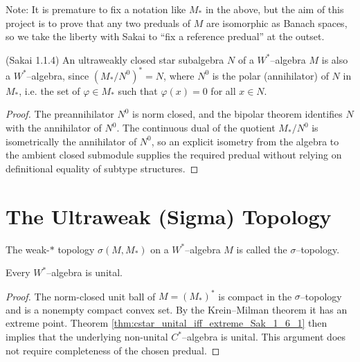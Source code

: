 Note: It is premature to fix a notation like $M_{*}$ in the above, but the aim of this project is to prove that any two
preduals of $M$ are isomorphic as Banach spaces, so we take the liberty with Sakai to ``fix a reference predual'' at the outset.

\begin{lemma}
    \label{lem:sigma_closed_star_subalg_wstar} (Sakai 1.1.4)
    \leanok
  An ultraweakly closed star subalgebra $N$ of a $W^{*}$--algebra $M$ is also a $W^{*}$--algebra, since $(M_{*}/N^{0})^{*}=N$, where
  $N^{0}$ is the polar (annihilator) of $N$ in $M_{*}$, i.e. the set of $\varphi\in M_{*}$ such that $\varphi(x)=0$ for all $x\in N$.
\end{lemma}

\begin{proof}
  \leanok
  The preannihilator $N^0$ is norm closed, and the bipolar theorem identifies $N$ with the
  annihilator of $N^0$. The continuous dual of the quotient $M_*/N^0$ is isometrically the
  annihilator of $N^0$, so an explicit isometry from the algebra to the ambient closed submodule
  supplies the required predual without relying on definitional equality of subtype structures.
\end{proof}

\section{The Ultraweak (Sigma) Topology}

\begin{definition}
  \label{def:sigma_top}
  \leanok
  The weak-$*$ topology $\sigma(M,M_{*})$ on a $W^{*}$--algebra $M$ is called the $\sigma$--topology.
\end{definition}

\begin{lemma}
  \label{lem:wstar_unital}
  \leanok
  Every $W^{*}$--algebra is unital.
\end{lemma}

\begin{proof}
  \leanok
  The norm-closed unit ball of $M=(M_{*})^{*}$ is compact in the $\sigma$--topology and is a
  nonempty compact convex set. By the Krein--Milman theorem it has an extreme point. Theorem
  \ref{thm:cstar_unital_iff_extreme_Sak_1_6_1} then implies that the underlying non-unital
  $C^{*}$--algebra is unital. This argument does not require completeness of the chosen predual.
\end{proof}

